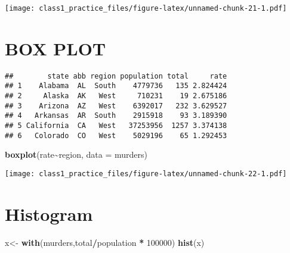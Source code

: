 \documentclass[
]{article}
\newenvironment{Shaded}{\begin{snugshade}}{\end{snugshade}}
\newcommand{\AttributeTok}[1]{\textcolor[rgb]{0.13,0.29,0.53}{#1}}
\newcommand{\DecValTok}[1]{\textcolor[rgb]{0.00,0.00,0.81}{#1}}
\newcommand{\FunctionTok}[1]{\textcolor[rgb]{0.13,0.29,0.53}{\textbf{#1}}}
\newcommand{\NormalTok}[1]{#1}
\newcommand{\OtherTok}[1]{\textcolor[rgb]{0.56,0.35,0.01}{#1}}
\newcommand{\SpecialCharTok}[1]{\textcolor[rgb]{0.81,0.36,0.00}{\textbf{#1}}}
\begin{document}
\texttt{[image: class1\_practice\_files/figure-latex/unnamed-chunk-21-1.pdf]}

\hypertarget{box-plot}{%
\section{BOX PLOT}\label{box-plot}}

\begin{Shaded}
\end{Shaded}

\begin{verbatim}
##        state abb region population total     rate
## 1    Alabama  AL  South    4779736   135 2.824424
## 2     Alaska  AK   West     710231    19 2.675186
## 3    Arizona  AZ   West    6392017   232 3.629527
## 4   Arkansas  AR  South    2915918    93 3.189390
## 5 California  CA   West   37253956  1257 3.374138
## 6   Colorado  CO   West    5029196    65 1.292453
\end{verbatim}

\begin{Shaded}
\begin{Highlighting}[]
\FunctionTok{boxplot}\NormalTok{(rate}\SpecialCharTok{\textasciitilde{}}\NormalTok{region, }\AttributeTok{data =}\NormalTok{ murders)}
\end{Highlighting}
\end{Shaded}

\texttt{[image: class1\_practice\_files/figure-latex/unnamed-chunk-22-1.pdf]}

\hypertarget{histogram}{%
\section{Histogram}\label{histogram}}

\begin{Shaded}
\begin{Highlighting}[]
\NormalTok{x}\OtherTok{\textless{}{-}} \FunctionTok{with}\NormalTok{(murders,total}\SpecialCharTok{/}\NormalTok{population }\SpecialCharTok{*} \DecValTok{100000}\NormalTok{)}
\FunctionTok{hist}\NormalTok{(x)}
\end{Highlighting}
\end{Shaded}
\end{document}
